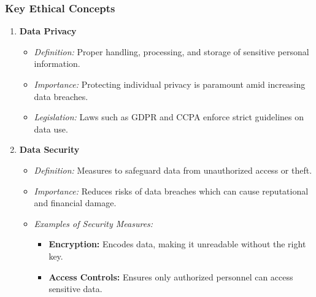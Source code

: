 \documentclass[aspectratio=169]{beamer}
\begin{document}
\begin{frame}[fragile]
    \frametitle{Key Ethical Concepts}
    \begin{enumerate}
        \item \textbf{Data Privacy}
            \begin{itemize}
                \item \textit{Definition:} Proper handling, processing, and storage of sensitive personal information.
                \item \textit{Importance:} Protecting individual privacy is paramount amid increasing data breaches.
                \item \textit{Legislation:} Laws such as GDPR and CCPA enforce strict guidelines on data use.
            \end{itemize}
        
        \item \textbf{Data Security}
            \begin{itemize}
                \item \textit{Definition:} Measures to safeguard data from unauthorized access or theft.
                \item \textit{Importance:} Reduces risks of data breaches which can cause reputational and financial damage.
                \item \textit{Examples of Security Measures:}
                    \begin{itemize}
                        \item \textbf{Encryption:} Encodes data, making it unreadable without the right key.
                        \item \textbf{Access Controls:} Ensures only authorized personnel can access sensitive data.
                    \end{itemize}
            \end{itemize}
    \end{enumerate}
\end{frame}
\end{document}
